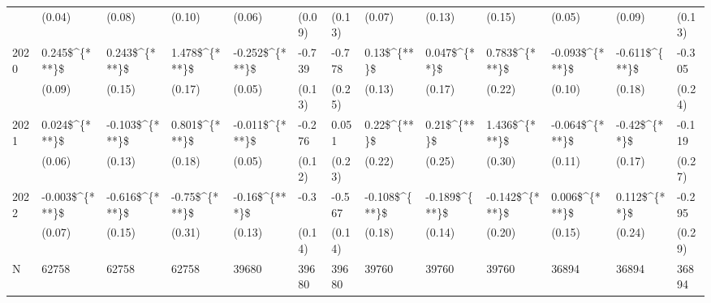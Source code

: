 \begin{tabular}{lllllllllllll}
          &          (0.04) &          (0.08) &         (0.10) &          (0.06) &  (0.09) &  (0.13) &         (0.07) &         (0.13) &          (0.15) &          (0.05) &         (0.09) &  (0.13) \\
2020      &   0.245\$\textasciicircum \{***\}\$ &   0.243\$\textasciicircum \{***\}\$ &  1.478\$\textasciicircum \{***\}\$ &  -0.252\$\textasciicircum \{***\}\$ &  -0.739 &  -0.778 &    0.13\$\textasciicircum \{**\}\$ &   0.047\$\textasciicircum \{**\}\$ &   0.783\$\textasciicircum \{***\}\$ &  -0.093\$\textasciicircum \{***\}\$ &  -0.611\$\textasciicircum \{**\}\$ &  -0.305 \\
          &          (0.09) &          (0.15) &         (0.17) &          (0.05) &  (0.13) &  (0.25) &         (0.13) &         (0.17) &          (0.22) &          (0.10) &         (0.18) &  (0.24) \\
2021      &   0.024\$\textasciicircum \{***\}\$ &  -0.103\$\textasciicircum \{***\}\$ &  0.801\$\textasciicircum \{***\}\$ &  -0.011\$\textasciicircum \{***\}\$ &  -0.276 &   0.051 &    0.22\$\textasciicircum \{**\}\$ &    0.21\$\textasciicircum \{**\}\$ &   1.436\$\textasciicircum \{***\}\$ &  -0.064\$\textasciicircum \{***\}\$ &   -0.42\$\textasciicircum \{**\}\$ &  -0.119 \\
          &          (0.06) &          (0.13) &         (0.18) &          (0.05) &  (0.12) &  (0.23) &         (0.22) &         (0.25) &          (0.30) &          (0.11) &         (0.17) &  (0.27) \\
2022      &  -0.003\$\textasciicircum \{***\}\$ &  -0.616\$\textasciicircum \{***\}\$ &  -0.75\$\textasciicircum \{***\}\$ &   -0.16\$\textasciicircum \{***\}\$ &    -0.3 &  -0.567 &  -0.108\$\textasciicircum \{**\}\$ &  -0.189\$\textasciicircum \{**\}\$ &  -0.142\$\textasciicircum \{***\}\$ &   0.006\$\textasciicircum \{***\}\$ &   0.112\$\textasciicircum \{**\}\$ &  -0.295 \\
          &          (0.07) &          (0.15) &         (0.31) &          (0.13) &  (0.14) &  (0.14) &         (0.18) &         (0.14) &          (0.20) &          (0.15) &         (0.24) &  (0.29) \\
N         &           62758 &           62758 &          62758 &           39680 &   39680 &   39680 &          39760 &          39760 &           39760 &           36894 &          36894 &   36894 \\
\bottomrule
\end{tabular}
